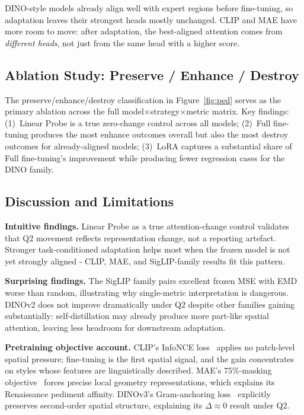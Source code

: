 \documentclass[lineno,pdflatex,sn-mathphys-num]{sn-jnl}%
\theoremstyle{thmstyleone}%
\theoremstyle{thmstyletwo}%
\theoremstyle{thmstylethree}%
\begin{document}
DINO-style models already align well with expert regions before fine-tuning,
so adaptation leaves their strongest heads mostly unchanged. CLIP and MAE
have more room to move: after adaptation, the best-aligned attention comes
from \emph{different heads}, not just from the same head with a higher score.

\subsection{Ablation Study: Preserve / Enhance / Destroy}

The preserve/enhance/destroy classification in Figure~\ref{fig:ped} serves as
the primary ablation across the full model$\times$strategy$\times$metric matrix.
Key findings: (1)~Linear Probe is a true zero-change control across all models;
(2)~Full fine-tuning produces the most enhance outcomes overall but also the most
destroy outcomes for already-aligned models; (3)~LoRA captures a substantial
share of Full fine-tuning's improvement while producing fewer regression cases
for the DINO family.

\subsection{Discussion and Limitations}

\textbf{Intuitive findings.} Linear Probe as a true attention-change control
validates that Q2 movement reflects representation change, not a reporting
artefact. Stronger task-conditioned adaptation helps most when the frozen model
is not yet strongly aligned - CLIP, MAE, and SigLIP-family results fit this
pattern.

\textbf{Surprising findings.} The SigLIP family pairs excellent frozen MSE with
EMD worse than random, illustrating why single-metric interpretation is
dangerous. DINOv2 does not improve dramatically under Q2 despite other families
gaining substantially: self-distillation may already produce more part-like
spatial attention, leaving less headroom for downstream adaptation.

\textbf{Pretraining objective account.} CLIP's InfoNCE loss~\cite{Radford21CLIP}
applies no patch-level spatial pressure; fine-tuning is the first spatial signal,
and the gain concentrates on styles whose features are linguistically described.
MAE's 75\%-masking objective~\cite{He22MAE} forces precise local geometry
representations, which explains its Renaissance pediment affinity. DINOv3's
Gram-anchoring loss~\cite{Simeoni25DINOv3} explicitly preserves second-order
spatial structure, explaining its $\Delta\!\approx\!0$ result under Q2.
\end{document}
